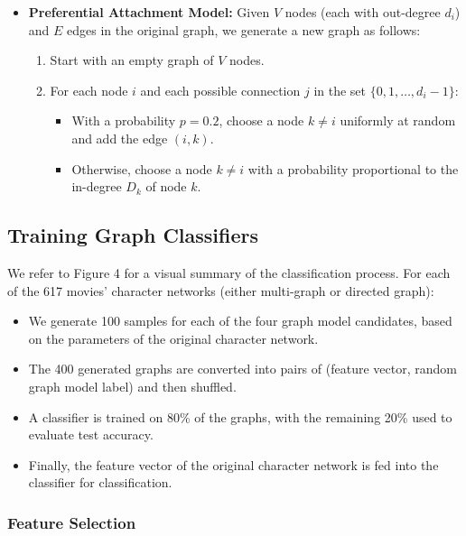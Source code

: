 \documentclass{article} %
\begin{document}
\begin{itemize}
    \item \textbf{Preferential Attachment Model:} Given \(V\) nodes (each with out-degree \(d_i\)) and \(E\) edges in the original graph, we generate a new graph as follows:
    \begin{enumerate}
        \item Start with an empty graph of \(V\) nodes.
        \item For each node \(i\) and each possible connection \(j\) in the set \(\{0, 1, \dots, d_i - 1\}\):
        \begin{itemize}
            \item With a probability \(p = 0.2\), choose a node \(k \neq i\) uniformly at random and add the edge \((i, k)\).
            \item Otherwise, choose a node \(k \neq i\) with a probability proportional to the in-degree \(D_k\) of node \(k\).
        \end{itemize}
    \end{enumerate}
\end{itemize}


\newpage
\subsection{Training Graph Classifiers}

We refer to Figure 4 for a visual summary of the classification process. For each of the 617 movies' character networks (either multi-graph or directed graph):

\begin{itemize}
    \item We generate 100 samples for each of the four graph model candidates, based on the parameters of the original character network.
    \item The 400 generated graphs are converted into pairs of (feature vector, random graph model label) and then shuffled.
    \item A classifier is trained on 80\% of the graphs, with the remaining 20\% used to evaluate test accuracy.
    \item Finally, the feature vector of the original character network is fed into the classifier for classification.
\end{itemize}

\subsubsection{Feature Selection}
\end{document}
